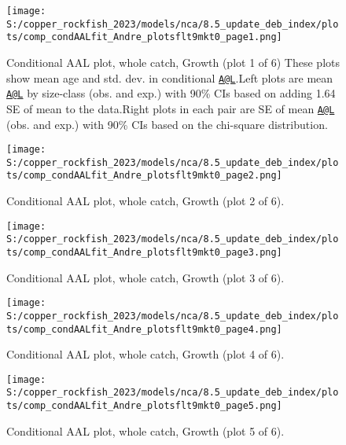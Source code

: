 \documentclass[11pt,
  english,
  letterpaper,
]{article}
\begin{document}
\begin{figure}
\centering
\texttt{[image: S:/copper\_rockfish\_2023/models/nca/8.5\_update\_deb\_index/plots/comp\_condAALfit\_Andre\_plotsflt9mkt0\_page1.png]}
\caption{Conditional AAL plot, whole catch, Growth (plot 1 of 6) These plots show mean age and std. dev. in conditional \href{mailto:A@L}{\nolinkurl{A@L}}.Left plots are mean \href{mailto:A@L}{\nolinkurl{A@L}} by size-class (obs. and exp.) with 90\% CIs based on adding 1.64 SE of mean to the data.Right plots in each pair are SE of mean \href{mailto:A@L}{\nolinkurl{A@L}} (obs. and exp.) with 90\% CIs based on the chi-square distribution.\label{fig:comp_condAALfit_Andre_plotsflt9mkt0_page1}}
\end{figure}

\begin{figure}
\centering
\texttt{[image: S:/copper\_rockfish\_2023/models/nca/8.5\_update\_deb\_index/plots/comp\_condAALfit\_Andre\_plotsflt9mkt0\_page2.png]}
\caption{Conditional AAL plot, whole catch, Growth (plot 2 of 6).\label{fig:comp_condAALfit_Andre_plotsflt9mkt0_page2}}
\end{figure}

\begin{figure}
\centering
\texttt{[image: S:/copper\_rockfish\_2023/models/nca/8.5\_update\_deb\_index/plots/comp\_condAALfit\_Andre\_plotsflt9mkt0\_page3.png]}
\caption{Conditional AAL plot, whole catch, Growth (plot 3 of 6).\label{fig:comp_condAALfit_Andre_plotsflt9mkt0_page3}}
\end{figure}

\begin{figure}
\centering
\texttt{[image: S:/copper\_rockfish\_2023/models/nca/8.5\_update\_deb\_index/plots/comp\_condAALfit\_Andre\_plotsflt9mkt0\_page4.png]}
\caption{Conditional AAL plot, whole catch, Growth (plot 4 of 6).\label{fig:comp_condAALfit_Andre_plotsflt9mkt0_page4}}
\end{figure}

\begin{figure}
\centering
\texttt{[image: S:/copper\_rockfish\_2023/models/nca/8.5\_update\_deb\_index/plots/comp\_condAALfit\_Andre\_plotsflt9mkt0\_page5.png]}
\caption{Conditional AAL plot, whole catch, Growth (plot 5 of 6).\label{fig:comp_condAALfit_Andre_plotsflt9mkt0_page5}}
\end{figure}
\end{document}
